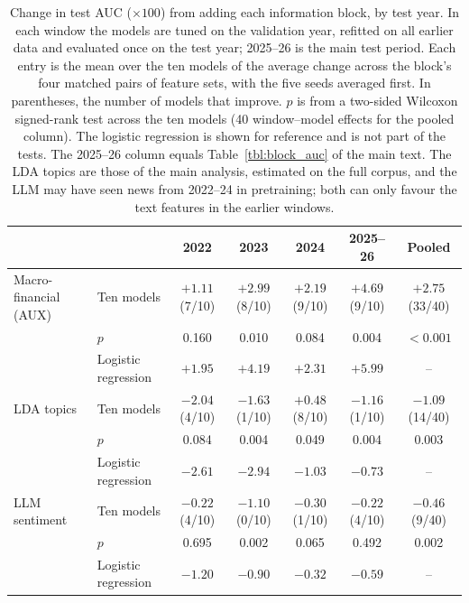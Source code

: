 \begin{table}[H]
\centering
\footnotesize
\renewcommand{\arraystretch}{1.15}
\caption{Change in test AUC ($\times 100$) from adding each information block, by test year. In each window the models are tuned on the validation year, refitted on all earlier data and evaluated once on the test year; 2025--26 is the main test period. Each entry is the mean over the ten models of the average change across the block's four matched pairs of feature sets, with the five seeds averaged first. In parentheses, the number of models that improve. $p$ is from a two-sided Wilcoxon signed-rank test across the ten models (40 window--model effects for the pooled column). The logistic regression is shown for reference and is not part of the tests. The 2025--26 column equals Table~\ref{tbl:block_auc} of the main text. The LDA topics are those of the main analysis, estimated on the full corpus, and the LLM may have seen news from 2022--24 in pretraining; both can only favour the text features in the earlier windows.}
\label{tbl:expanding_origin_blocks}
\begin{tabular}{@{} l l ccccc @{}}
\toprule
 & & 2022 & 2023 & 2024 & 2025--26 & Pooled \\
\midrule
Macro-financial (AUX) & Ten models & $+1.11$ (7/10) & $+2.99$ (8/10) & $+2.19$ (9/10) & $+4.69$ (9/10) & $+2.75$ (33/40) \\
 & $p$ & 0.160 & 0.010 & 0.084 & 0.004 & $<0.001$ \\
 & Logistic regression & $+1.95$ & $+4.19$ & $+2.31$ & $+5.99$ & -- \\
\addlinespace[3pt]
LDA topics & Ten models & $-2.04$ (4/10) & $-1.63$ (1/10) & $+0.48$ (8/10) & $-1.16$ (1/10) & $-1.09$ (14/40) \\
 & $p$ & 0.084 & 0.004 & 0.049 & 0.004 & 0.003 \\
 & Logistic regression & $-2.61$ & $-2.94$ & $-1.03$ & $-0.73$ & -- \\
\addlinespace[3pt]
LLM sentiment & Ten models & $-0.22$ (4/10) & $-1.10$ (0/10) & $-0.30$ (1/10) & $-0.22$ (4/10) & $-0.46$ (9/40) \\
 & $p$ & 0.695 & 0.002 & 0.065 & 0.492 & 0.002 \\
 & Logistic regression & $-1.20$ & $-0.90$ & $-0.32$ & $-0.59$ & -- \\
\bottomrule
\end{tabular}
\end{table}